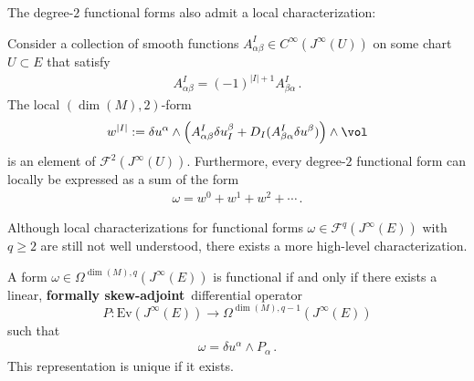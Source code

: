     The degree-$2$ functional forms also admit a local characterization:
    \begin{property}
        Consider a collection of smooth functions $A^I_{\alpha\beta}\in C^\infty(J^\infty(U))$ on some chart $U\subset E$ that satisfy
        \begin{gather}
            A^I_{\alpha\beta} = (-1)^{|I|+1}A^I_{\beta\alpha}\,.
        \end{gather}
        The local $(\dim(M),2)$-form
        \begin{gather}
            w^{|I|} := \delta u^\alpha\wedge\left(A^I_{\alpha\beta}\delta u^\beta_I + D_I(A^I_{\beta\alpha}\delta u^\beta)\right)\wedge\vol
        \end{gather}
        is an element of $\mathcal{F}^2(J^\infty(U))$. Furthermore, every degree-$2$ functional form can locally be expressed as a sum of the form
        \begin{gather}
            \omega = w^0 + w^1 + w^2 + \cdots\,.
        \end{gather}
    \end{property}

    Although local characterizations for functional forms $\omega\in\mathcal{F}^q(J^\infty(E))$ with $q\geq2$ are still not well understood, there exists a more high-level characterization.
    \begin{property}
        A form $\omega\in\Omega^{\dim(M),q}(J^\infty(E))$ is functional if and only if there exists a linear, \textbf{formally skew-adjoint}\footnotemark\ differential operator \[P:\mathrm{Ev}(J^\infty(E))\rightarrow\Omega^{\dim(M),q-1}(J^\infty(E))\] such that
        \begin{gather}
            \omega = \delta u^\alpha\wedge P_\alpha\,.
        \end{gather}
        This representation is unique if it exists.
    \end{property}

